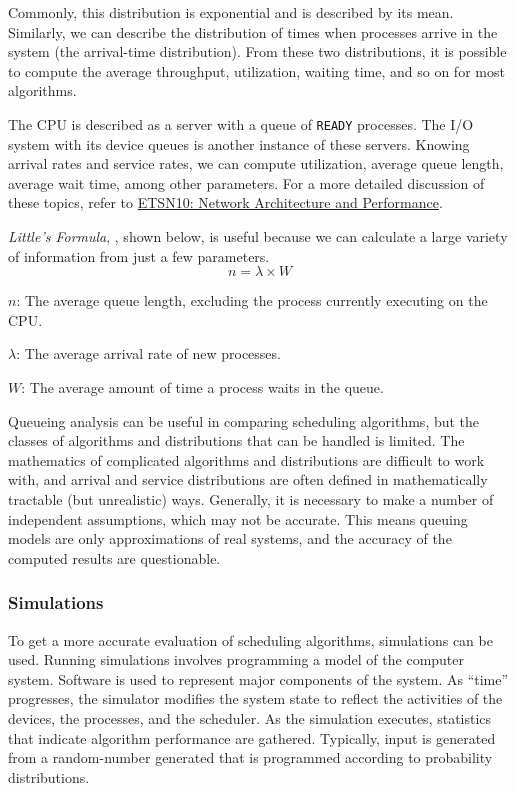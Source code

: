 Commonly, this distribution is exponential and is described by its mean.
Similarly, we can describe the distribution of times when processes arrive in
the system (the arrival-time distribution). From these two distributions, it is
possible to compute the average throughput, utilization, waiting time, and so
on for most algorithms.

The CPU is described as a server with a queue of \texttt{READY} processes.
The I/O system with its device queues is another instance of these servers.
Knowing arrival rates and service rates, we can compute utilization, average queue length, average wait time, among other parameters.
For a more detailed discussion of these topics, refer to \href{file:./ETSN10-Network_Architecture_Performance-Reference_Material.pdf}{ETSN10: Network Architecture and Performance}.

\emph{Little's Formula}, , shown below, is useful because we can calculate a large variety of information from just a few parameters.
\begin{equation}\label{eq:Littles_Law}
  n = \lambda \times W
\end{equation}
\begin{description}[noitemsep]
\item $n$: The average queue length, excluding the process currently executing on the CPU.\@
\item $\lambda$: The average arrival rate of new processes.
\item $W$: The average amount of time a process waits in the queue.
\end{description}

Queueing analysis can be useful in comparing scheduling algorithms, but the classes of algorithms and distributions that can be handled is limited.
The mathematics of complicated algorithms and distributions are difficult to work with, and arrival and service distributions are often defined in mathematically tractable (but unrealistic) ways.
Generally, it is necessary to make a number of independent assumptions, which may not be accurate.
This means queuing models are only approximations of real systems, and the accuracy of the computed results are questionable.

\subsubsection{Simulations}\label{subsubsec:Algorithm_Simulations}
To get a more accurate evaluation of scheduling algorithms, simulations can be used.
Running simulations involves programming a model of the computer system.
Software is used to represent major components of the system.
As ``time'' progresses, the simulator modifies the system state to reflect the activities of the devices, the processes, and the scheduler.
As the simulation executes, statistics that indicate algorithm performance are gathered.
Typically, input is generated from a random-number generated that is programmed according to probability distributions.

